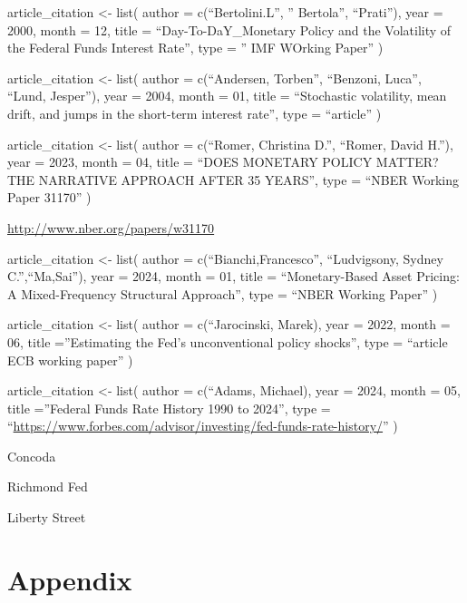 \documentclass[
]{article}
\begin{document}
article\_citation \textless- list(
author = c(``Bertolini.L'', '' Bertola'', ``Prati''),
year = 2000,
month = 12,
title = ``Day-To-DaY\_Monetary Policy and the Volatility of the Federal Funds Interest Rate'',
type = '' IMF WOrking Paper''
)

article\_citation \textless- list(
author = c(``Andersen, Torben'', ``Benzoni, Luca'', ``Lund, Jesper''),
year = 2004,
month = 01,
title = ``Stochastic volatility, mean drift, and jumps in the short-term interest rate'',
type = ``article''
)

article\_citation \textless- list(
author = c(``Romer, Christina D.'', ``Romer, David H.''),
year = 2023,
month = 04,
title = ``DOES MONETARY POLICY MATTER? THE NARRATIVE APPROACH AFTER 35 YEARS'',
type = ``NBER Working Paper 31170''
)

\url{http://www.nber.org/papers/w31170}

article\_citation \textless- list(
author = c(``Bianchi,Francesco'', ``Ludvigsony, Sydney C.'',``Ma,Sai''),
year = 2024,
month = 01,
title = ``Monetary-Based Asset Pricing: A Mixed-Frequency Structural
Approach'',
type = ``NBER Working Paper''
)

article\_citation \textless- list(
author = c(``Jarocinski, Marek),
year = 2022,
month = 06,
title =''Estimating the Fed's unconventional policy shocks'',
type = ``article ECB working paper''
)

article\_citation \textless- list(
author = c(``Adams, Michael),
year = 2024,
month = 05,
title =''Federal Funds Rate History 1990 to 2024'',
type = ``\url{https://www.forbes.com/advisor/investing/fed-funds-rate-history/}''
)

Concoda

Richmond Fed

Liberty Street

\hypertarget{appendix}{%
\section{Appendix}\label{appendix}}
\end{document}
